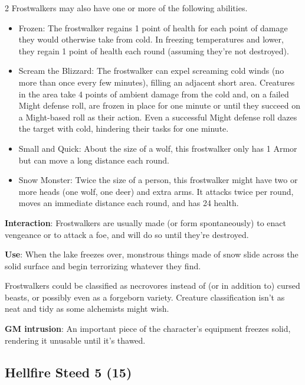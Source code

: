 \begin{multicols}{2}
Frostwalkers may also have one or more of the following abilities.
\begin{itemize}
\item Frozen: The frostwalker regains 1 point of health for each point of damage they would otherwise take from cold. In freezing temperatures and lower, they regain 1 point of health each round (assuming they’re not destroyed). 
\item	Scream the Blizzard: The frostwalker can expel screaming cold winds (no more than once every few minutes), filling an adjacent short area. Creatures in the area take 4 points of ambient damage from the cold and, on a failed Might defense roll, are frozen in place for one minute or until they succeed on a Might-based roll as their action. Even a successful Might defense roll dazes the target with cold, hindering their tasks for one minute. 
\item	Small and Quick: About the size of a wolf, this frostwalker only has 1 Armor but can move a long distance each round. 
\item	Snow Monster: Twice the size of a person, this frostwalker might have two or more heads (one wolf, one deer) and extra arms. It attacks twice per round, moves an immediate distance each round, and has 24 health.
\end{itemize}

\textbf{Interaction}: Frostwalkers are usually made (or form spontaneously) to enact vengeance or to attack a foe, and will do so until they’re destroyed. 

\textbf{Use}: When the lake freezes over, monstrous things made of snow slide across the solid surface and begin terrorizing whatever they find.

Frostwalkers could be classified as necrovores instead of (or in addition to) cursed beasts, or possibly even as a forgeborn variety. Creature classification isn’t as neat and tidy as some alchemists might wish.

\textbf{GM intrusion}: An important piece of the character’s equipment freezes solid, rendering it unusable until it’s thawed.

\subsection{Hellfire Steed 5 (15)}


\end{multicols}
